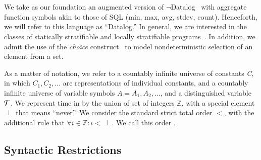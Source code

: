 \section{\lang}
We take as our foundation an augmented version of
$\lnot$Datalog~\cite{ullmanbook} with aggregate function symbols akin to those
of SQL (min, max, avg, stdev, count).  Henceforth, we will refer to this
language as ``Datalog.'' In general, we are interested in the classes of
statically stratifiable and locally stratifiable programs~\cite{prz}.  In
addition, we admit the use of the \emph{choice} construct~\cite{greedychoice,
eventchoice} to model nondeterministic selection of an element from a set.  

As a matter of notation, we refer to a countably infinite universe of constants
\emph{C}, in which $C_{1}, C_{2}, \ldots$ are representations of individual
constants, and a countably infinite universe of variable symbols $A = A_1, A_2,
\ldots$, and a distinguished variable $\Tau$. 
We represent time in \lang by the union of set of integers $\mathbb{Z}$, with a
special element $\perp$ that means ``never''.  We consider the standard strict
total order $<$, with the additional rule that $\forall i \in \mathbb{Z}: i <
\perp$.  We call this order .


\subsection{Syntactic Restrictions}



